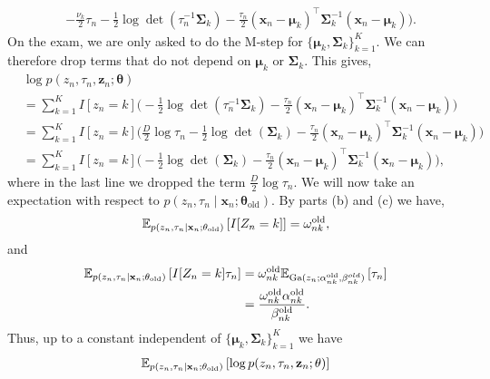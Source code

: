 \begin{enumerate}[label = (\alph*)]
\begin{align}
        & - \frac{\nu_k}{2}\tau_n -\frac{1}{2}\log \det(\tau_n^{-1}\mathbf{\Sigma}_k) - \frac{\tau_n}{2}(\mathbf{x}_n - \mathbf{\mu}_k)^\top \mathbf{\Sigma}_k^{-1}(\mathbf{x}_n - \mathbf{\mu}_k) \bigg).\label{eq:2022 Q5 log like}
    \end{align}
    On the exam, we are only asked to do the M-step for $\{\mathbf{\mu}_k,\mathbf{\Sigma}_k\}_{k=1}^K$. We can therefore drop terms that do not depend on $\mathbf{\mu}_k$ or $\mathbf{\Sigma}_k$. This gives,
    \begin{align*}
        &\log p(z_n,\tau_n,\mathbf{z}_n;\mathbf{\theta})\\
        &=\sum_{k=1}^K I[z_n = k]\bigg(-\frac{1}{2}\log \det(\tau_n^{-1}\mathbf{\Sigma}_k) - \frac{\tau_n}{2}(\mathbf{x}_n - \mathbf{\mu}_k)^\top \mathbf{\Sigma}_k^{-1}(\mathbf{x}_n - \mathbf{\mu}_k) \bigg)\\
        &=\sum_{k=1}^K I[z_n = k]\bigg(\frac{D}{2}\log\tau_n-\frac{1}{2}\log \det(\mathbf{\Sigma}_k) - \frac{\tau_n}{2}(\mathbf{x}_n - \mathbf{\mu}_k)^\top \mathbf{\Sigma}_k^{-1}(\mathbf{x}_n - \mathbf{\mu}_k) \bigg)\\
        &=\sum_{k=1}^K I[z_n = k]\bigg(-\frac{1}{2}\log \det(\mathbf{\Sigma}_k) - \frac{\tau_n}{2}(\mathbf{x}_n - \mathbf{\mu}_k)^\top \mathbf{\Sigma}_k^{-1}(\mathbf{x}_n - \mathbf{\mu}_k) \bigg),
    \end{align*}
    where in the last line we dropped the term $\frac{D}{2}\log\tau_n$. We will now take an expectation with respect to $p(z_n,\tau_n\mid \mathbf{x}_n ;\mathbf{\theta}_{\mathrm{old}})$. By parts (b) and (c) we have,
    \begin{align*}
        {\mathbb E}_{p(z_n, \tau_n \mid \mathbf{x}_n;\mathbf{\theta}_{\mathrm{old}})}\left[I[Z_n = k]\right] = \omega_{nk}^{\mathrm{old}},
    \end{align*}
    and 
    \begin{align*}
    {\mathbb E}_{p(z_n,\tau_n \mid \mathbf{x}_n;\mathbf{\theta}_{\mathrm{old}})}\left[I[Z_n=k]\tau_n\right]
        &=\omega_{nk}^{\mathrm{old}}{\mathbb E}_{\mathrm{Ga}(z_n;\alpha_{nk}^{\text{old}}, \beta_{nk}^{old})}\left[\tau_n\right]\\
        &= \frac{\omega_{nk}^{\mathrm{old}}\alpha_{nk}^{\text{old}}}{\beta_{nk}^{\text{old}}}.
    \end{align*}
    Thus, up to a constant independent of $\{\mathbf{\mu}_k,\mathbf{\Sigma}_k\}_{k=1}^K$ we have
    \begin{align*}
        &\bbE_{p(z_n, \tau_n \mid \mathbf{x}_n;\mathbf{\theta}_{\mathrm{old}})}\left[\log p(z_n,\tau_n,\mathbf{z}_n;\mathbf{\theta})\right]\\

\end{align*}
\end{enumerate}

